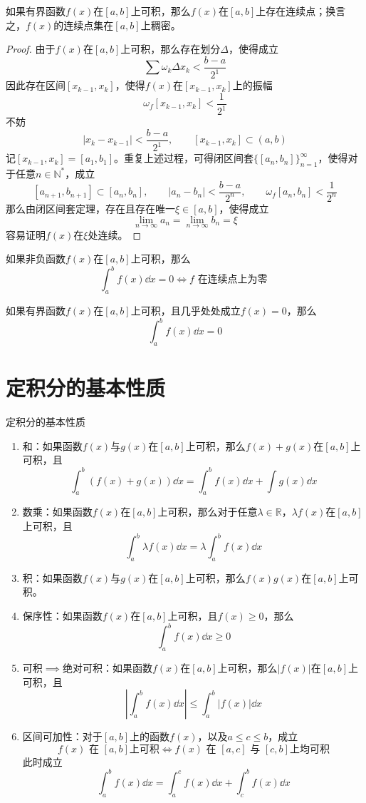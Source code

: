 \documentclass[lang = cn, scheme = chinese, thmcnt = section]{elegantbook}
\newcommand{\N}{\mathbb{N}}            %
\newcommand{\R}{\mathbb{R}}            %
\newcommand{\sub}{\subset}             %
\begin{document}
\begin{theorem}
	如果有界函数$f(x)$在$[a,b]$上可积，那么$f(x)$在$[a,b]$上存在连续点；换言之，$f(x)$的连续点集在$[a,b]$上稠密。
\end{theorem}

\begin{proof}
	由于$f(x)$在$[a,b]$上可积，那么存在划分$\Delta$，使得成立
	$$
	\sum \omega_k \Delta x_k <\frac{b-a}{2^1}
	$$
	因此存在区间$[x_{k-1},x_{k}]$，使得$f(x)$在$[x_{k-1},x_{k}]$上的振幅
	$$
	\omega_f[x_{k-1},x_{k}] <\frac{1}{2^1}
	$$
	不妨
	$$
	|x_k-x_{k-1}|<\frac{b-a}{2^1},\qquad [x_{k-1},x_{k}] \sub (a,b)
	$$
	记$[x_{k-1},x_{k}]=[a_1,b_1]$。重复上述过程，可得闭区间套$\{[a_n,b_n]\}_{n=1}^{\infty}$，使得对于任意$n\in\N^*$，成立
	$$
	[a_{n+1},b_{n+1}]\sub [a_n,b_n],\qquad
	|a_n-b_n|<\frac{b-a}{2^n},\qquad 
	\omega_f[a_n,b_n] <\frac{1}{2^n}
	$$
	那么由闭区间套定理，存在且存在唯一$\xi\in [a,b]$，使得成立
	$$
	\lim_{n\to\infty} a_n=\lim_{n\to\infty} b_n=\xi
	$$
	容易证明$f(x)$在$\xi$处连续。
\end{proof}

\begin{theorem}
	如果非负函数$f(x)$在$[a,b]$上可积，那么
	$$
	\int_{a}^{b}f(x)\dd x=0
	\iff 
	f\text{ 在连续点上为零 }
	$$
\end{theorem}

\begin{theorem}
	如果有界函数$f(x)$在$[a,b]$上可积，且几乎处处成立$f(x)=0$，那么
	$$
	\int_{a}^{b}f(x)\dd x=0
	$$
\end{theorem}

\section{定积分的基本性质}

\begin{proposition}{定积分的基本性质}
	\begin{enumerate}
		\item 和：如果函数$f(x)$与$g(x)$在$[a,b]$上可积，那么$f(x)+g(x)$在$[a,b]$上可积，且
		$$
		\int_a^b (f(x)+g(x))\dd x
		=\int_a^b f(x)\dd x+\int g(x)\dd x
		$$
		\item 数乘：如果函数$f(x)$在$[a,b]$上可积，那么对于任意$\lambda\in \R$，$\lambda f(x)$在$[a,b]$上可积，且
		$$
		\int_a^b \lambda f(x)\dd x
		=\lambda \int_a^b f(x)\dd x
		$$
		\item 积：如果函数$f(x)$与$g(x)$在$[a,b]$上可积，那么$f(x)g(x)$在$[a,b]$上可积。
		\item 保序性：如果函数$f(x)$在$[a,b]$上可积，且$f(x)\ge 0$，那么
		$$
		\int_a^b f(x)\dd x\ge 0
		$$
		\item 可积$\implies$绝对可积：如果函数$f(x)$在$[a,b]$上可积，那么$|f(x)|$在$[a,b]$上可积，且
		$$
		\left| \int_a^b f(x)\dd x \right|
		\le
		\int_a^b\left|  f(x) \right|\dd x
		$$
		\item 区间可加性：对于$[a,b]$上的函数$f(x)$，以及$a\le c\le b$，成立
		$$
		f(x)\text{ 在 }[a,b]\text{上可积}
		\iff
		f(x)\text{ 在 }[a,c]\text{ 与 }[c,b]\text{上均可积}
		$$
		此时成立
		$$
		\int_a^b f(x)\dd x
		=\int_a^c f(x)\dd x+\int_c^b f(x)\dd x
		$$
	\end{enumerate}
\end{proposition}
\end{document}
